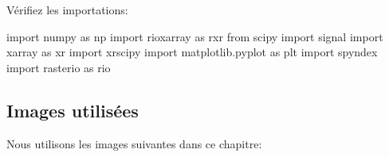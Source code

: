 \documentclass[
  11pt,
  letterpaper,
  open=any,
  twoside=false,
  french]{scrbook}
\newenvironment{Shaded}{\begin{snugshade}}{\end{snugshade}}
\newcommand{\ImportTok}[1]{\textcolor[rgb]{0.00,0.46,0.62}{#1}}
\newcommand{\NormalTok}[1]{\textcolor[rgb]{0.00,0.23,0.31}{#1}}
\begin{document}
Vérifiez les importations:

\begin{Shaded}
\begin{Highlighting}[]
\ImportTok{import}\NormalTok{ numpy }\ImportTok{as}\NormalTok{ np}
\ImportTok{import}\NormalTok{ rioxarray }\ImportTok{as}\NormalTok{ rxr}
\ImportTok{from}\NormalTok{ scipy }\ImportTok{import}\NormalTok{ signal}
\ImportTok{import}\NormalTok{ xarray }\ImportTok{as}\NormalTok{ xr}
\ImportTok{import}\NormalTok{ xrscipy}
\ImportTok{import}\NormalTok{ matplotlib.pyplot }\ImportTok{as}\NormalTok{ plt}
\ImportTok{import}\NormalTok{ spyndex}
\ImportTok{import}\NormalTok{ rasterio }\ImportTok{as}\NormalTok{ rio}
\end{Highlighting}
\end{Shaded}

\subsection{Images utilisées}\label{images-utilisuxe9es}

Nous utilisons les images suivantes dans ce chapitre:
\end{document}
